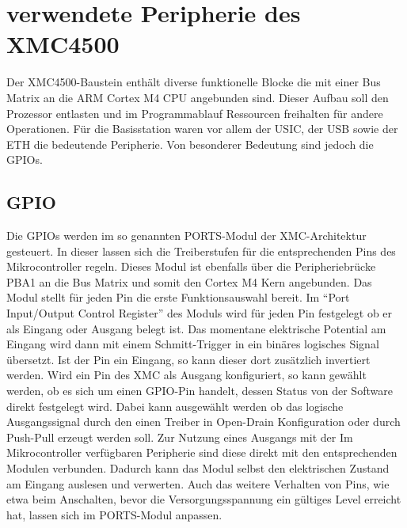 \section{verwendete Peripherie des XMC4500}
Der XMC4500-Baustein enthält diverse funktionelle Blocke die mit einer Bus Matrix an die ARM Cortex M4 \ac{CPU} angebunden sind. Dieser Aufbau soll den Prozessor entlasten und im Programmablauf Ressourcen freihalten für andere Operationen.%
Für die Basisstation waren vor allem der \ac{USIC}, der \ac{USB} sowie der \ac{ETH} die bedeutende Peripherie. Von besonderer Bedeutung sind jedoch die \acp{GPIO}. %
\subsection{GPIO}
Die \acp{GPIO} werden im so genannten PORTS-Modul der XMC-Architektur gesteuert. In dieser lassen sich die Treiberstufen für die entsprechenden Pins des Mikrocontroller regeln. Dieses Modul ist ebenfalls über die Peripheriebrücke PBA1 an die Bus Matrix  und somit den Cortex M4 Kern angebunden.  %
Das Modul stellt für jeden Pin die erste Funktionsauswahl bereit. Im \enquote{Port Input/Output Control Register} des Moduls wird für jeden Pin festgelegt ob er als Eingang oder Ausgang belegt ist. Das momentane elektrische Potential am Eingang wird dann mit einem Schmitt-Trigger in ein binäres logisches Signal übersetzt. Ist der Pin ein Eingang, so kann dieser dort zusätzlich invertiert werden. Wird ein Pin des XMC als Ausgang konfiguriert, so kann gewählt werden, ob es sich um einen \ac{GPIO}-Pin handelt, dessen Status von der Software direkt festgelegt wird. Dabei kann ausgewählt werden ob das logische Ausgangssignal durch den einen Treiber in Open-Drain Konfiguration oder durch Push-Pull erzeugt werden soll. Zur Nutzung eines Ausgangs mit der Im Mikrocontroller verfügbaren Peripherie sind diese direkt mit den entsprechenden Modulen verbunden. Dadurch kann das Modul selbst den elektrischen Zustand am Eingang auslesen und verwerten\cite{XMC-Reference}. 
Auch das weitere Verhalten von Pins, wie etwa  beim Anschalten, bevor die Versorgungsspannung ein gültiges Level erreicht hat, lassen sich im PORTS-Modul anpassen.
